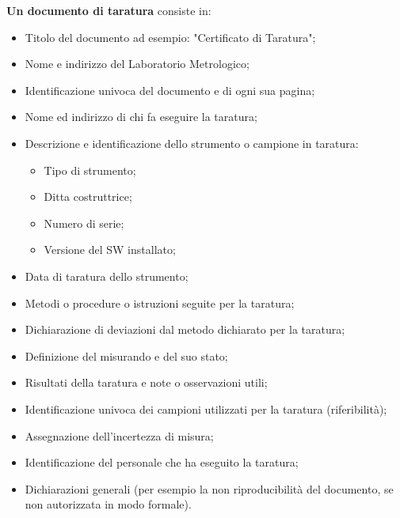 \documentclass[a4paper, 15pt]{article}
\begin{document}
\begin{adjustwidth}{2in}{}
   		\textbf{Un documento di taratura} consiste in: 
   		\begin{itemize}
   			\item Titolo del documento ad esempio: "Certificato di Taratura";
   			\item Nome e indirizzo del Laboratorio Metrologico;
   			\item Identificazione univoca del documento e di ogni sua pagina;
   			\item Nome ed indirizzo di chi fa eseguire la taratura;
   			\item Descrizione e identificazione dello strumento o campione in taratura:
   			\begin{itemize}
   				\item Tipo di strumento;
   				\item Ditta costruttrice;
   				\item Numero di serie;
   				\item Versione del SW installato;
   			\end{itemize}
   			\item Data di taratura dello strumento;
   			\item Metodi o procedure o istruzioni seguite per la taratura;
   			\item Dichiarazione di deviazioni dal metodo dichiarato per la taratura;
   			\item Definizione del misurando e del suo stato;
   			\item Risultati della taratura e note o osservazioni utili;
   			\item Identificazione univoca dei campioni utilizzati per la taratura (riferibilità);
   			\item Assegnazione dell'incertezza di misura;
   			\item Identificazione del personale che ha eseguito la taratura;
   			\item Dichiarazioni generali (per esempio la non riproducibilità del documento, se non
   			autorizzata in modo formale).
   		\end{itemize}
\end{adjustwidth}   	
\end{document}
